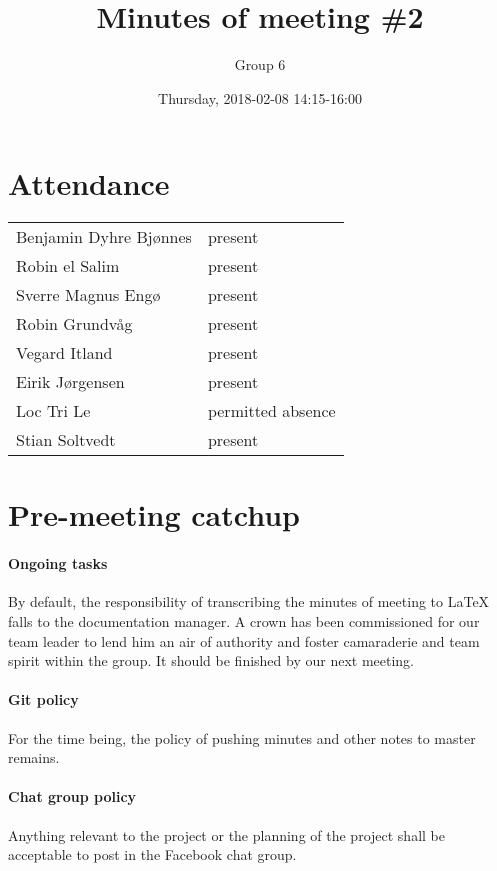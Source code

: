 \documentclass{article}
\title{Minutes of meeting \#2}
\author{Group 6}
\date{Thursday, 2018-02-08 14:15-16:00}
\begin{document}
\maketitle

\section{Attendance}
\begin{tabular}{l l}
    Benjamin Dyhre Bjønnes     & present \\
    Robin el Salim             & present \\
    Sverre Magnus Engø         & present \\
    Robin Grundvåg             & present \\
    Vegard Itland              & present \\
    Eirik Jørgensen            & present \\
    Loc Tri Le                 & permitted absence \\
    Stian Soltvedt             & present
\end{tabular}

\section{Pre-meeting catchup}

\paragraph{Ongoing tasks}

By default, the responsibility of transcribing the minutes of meeting to LaTeX falls to the documentation manager. A crown has been commissioned for our team leader to lend him an air of authority and foster camaraderie and team spirit within the group. It should be finished by our next meeting.

\paragraph{Git policy}

For the time being, the policy of pushing minutes and other notes to master remains.

\paragraph{Chat group policy}

Anything relevant to the project or the planning of the project shall be acceptable to post in the Facebook chat group.
\end{document}
